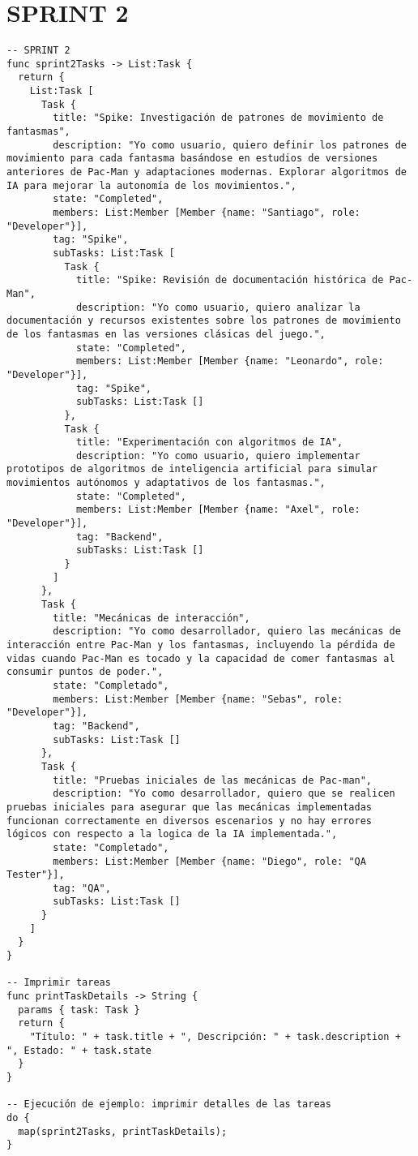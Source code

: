 \documentclass{article}
\begin{document}
\section{SPRINT 2}
\begin{verbatim}
-- SPRINT 2
func sprint2Tasks -> List:Task {
  return {
    List:Task [
      Task {
        title: "Spike: Investigación de patrones de movimiento de fantasmas",
        description: "Yo como usuario, quiero definir los patrones de movimiento para cada fantasma basándose en estudios de versiones anteriores de Pac-Man y adaptaciones modernas. Explorar algoritmos de IA para mejorar la autonomía de los movimientos.",
        state: "Completed",
        members: List:Member [Member {name: "Santiago", role: "Developer"}],
        tag: "Spike",
        subTasks: List:Task [
          Task {
            title: "Spike: Revisión de documentación histórica de Pac-Man",
            description: "Yo como usuario, quiero analizar la documentación y recursos existentes sobre los patrones de movimiento de los fantasmas en las versiones clásicas del juego.",
            state: "Completed",
            members: List:Member [Member {name: "Leonardo", role: "Developer"}],
            tag: "Spike",
            subTasks: List:Task []
          },
          Task {
            title: "Experimentación con algoritmos de IA",
            description: "Yo como usuario, quiero implementar prototipos de algoritmos de inteligencia artificial para simular movimientos autónomos y adaptativos de los fantasmas.",
            state: "Completed",
            members: List:Member [Member {name: "Axel", role: "Developer"}],
            tag: "Backend",
            subTasks: List:Task []
          }
        ]
      },
      Task {
        title: "Mecánicas de interacción",
        description: "Yo como desarrollador, quiero las mecánicas de interacción entre Pac-Man y los fantasmas, incluyendo la pérdida de vidas cuando Pac-Man es tocado y la capacidad de comer fantasmas al consumir puntos de poder.",
        state: "Completado",
        members: List:Member [Member {name: "Sebas", role: "Developer"}],
        tag: "Backend",
        subTasks: List:Task []
      },
      Task {
        title: "Pruebas iniciales de las mecánicas de Pac-man",
        description: "Yo como desarrollador, quiero que se realicen pruebas iniciales para asegurar que las mecánicas implementadas funcionan correctamente en diversos escenarios y no hay errores lógicos con respecto a la logica de la IA implementada.",
        state: "Completado",
        members: List:Member [Member {name: "Diego", role: "QA Tester"}],
        tag: "QA",
        subTasks: List:Task []
      }
    ]
  }
}

-- Imprimir tareas
func printTaskDetails -> String {
  params { task: Task }
  return {
    "Título: " + task.title + ", Descripción: " + task.description + ", Estado: " + task.state 
  }
}

-- Ejecución de ejemplo: imprimir detalles de las tareas
do {
  map(sprint2Tasks, printTaskDetails);
}
\end{verbatim}
\end{document}
